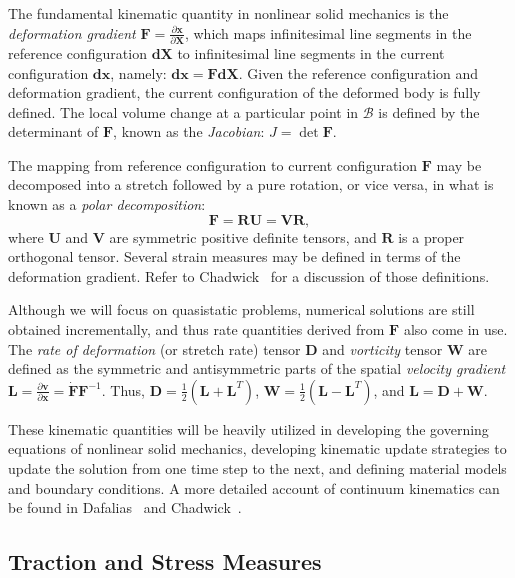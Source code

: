 The fundamental kinematic quantity in nonlinear solid mechanics is the \textit{deformation gradient} $\bm{F} = \frac{\partial \bm{x}}{\partial \bm{X}}$, which maps infinitesimal line segments in the reference configuration $\bm{dX}$ to infinitesimal line segments in the current configuration $\bm{dx}$, namely: $\bm{dx} = \bm{F}\bm{dX}$. Given the reference configuration and deformation gradient, the current configuration of the deformed body is fully defined. The local volume change at a particular point in $\mathcal{B}$ is defined by the determinant of $\bm{F}$, known as the \textit{Jacobian}: $J = \det{\bm{F}}$.

The mapping from reference configuration to current configuration $\bm{F}$ may be decomposed into a  stretch followed by a pure rotation, or vice versa, in what is known as a \textit{polar decomposition}:
\begin{equation}
\bm{F} = \bm{R}\bm{U} = \bm{V}\bm{R},
\end{equation}
where $\bm{U}$ and $\bm{V}$ are symmetric positive definite tensors, and $\bm{R}$ is a proper orthogonal tensor. Several strain measures may be defined in terms of the deformation gradient. Refer to Chadwick~\cite{chadwick_1999} for a discussion of those definitions.

Although we will focus on quasistatic problems, numerical solutions are still obtained incrementally, and thus rate quantities derived from $\bm{F}$ also come in use. The \textit{rate of deformation} (or stretch rate) tensor $\bm{D}$ and \textit{vorticity} tensor $\bm{W}$ are defined as the symmetric and antisymmetric parts of the spatial \textit{velocity gradient} $\bm{L} = \frac{\partial \bm{v}}{\partial \bm{x}} = \dot{\bm{F}}{\bm{F}}^{-1}$. Thus, $\bm{D} = \frac{1}{2}(\bm{L} + \bm{L}^T)$, $\bm{W} = \frac{1}{2}(\bm{L} - \bm{L}^T)$, and $\bm{L} = \bm{D} + \bm{W}$.

These kinematic quantities will be heavily utilized in developing the governing equations of nonlinear solid mechanics, developing kinematic update strategies to update the solution from one time step to the next, and defining material models and boundary conditions. A more detailed account of continuum kinematics can be found in Dafalias~\cite{dafalias_205} and Chadwick~\cite{chadwick_1999}.

\subsection{Traction and Stress Measures}


